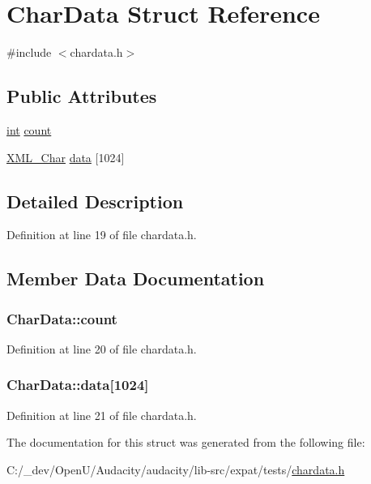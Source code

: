 \hypertarget{struct_char_data}{}\section{Char\+Data Struct Reference}
\label{struct_char_data}


{\ttfamily \#include $<$chardata.\+h$>$}

\subsection*{Public Attributes}
\begin{DoxyCompactItemize}
\item 
\hyperlink{xmltok_8h_a5a0d4a5641ce434f1d23533f2b2e6653}{int} \hyperlink{struct_char_data_a33c82202839221aab1e56ceef96e17b3}{count}
\item 
\hyperlink{amiga_2include_2libraries_2expat_8h_a63da96463e775e1ec3a7d1f076208127}{X\+M\+L\+\_\+\+Char} \hyperlink{struct_char_data_a37aff9bb49286929713649ead0ce31ee}{data} \mbox{[}1024\mbox{]}
\end{DoxyCompactItemize}


\subsection{Detailed Description}


Definition at line 19 of file chardata.\+h.



\subsection{Member Data Documentation}
\subsubsection[{\texorpdfstring{count}{count}}]{ Char\+Data\+::count}\hypertarget{struct_char_data_a33c82202839221aab1e56ceef96e17b3}{}\label{struct_char_data_a33c82202839221aab1e56ceef96e17b3}


Definition at line 20 of file chardata.\+h.

\subsubsection[{\texorpdfstring{data}{data}}]{ Char\+Data\+::data\mbox{[}1024\mbox{]}}\hypertarget{struct_char_data_a37aff9bb49286929713649ead0ce31ee}{}\label{struct_char_data_a37aff9bb49286929713649ead0ce31ee}


Definition at line 21 of file chardata.\+h.



The documentation for this struct was generated from the following file\+:\begin{DoxyCompactItemize}
\item 
C\+:/\+\_\+dev/\+Open\+U/\+Audacity/audacity/lib-\/src/expat/tests/\hyperlink{chardata_8h}{chardata.\+h}\end{DoxyCompactItemize}
